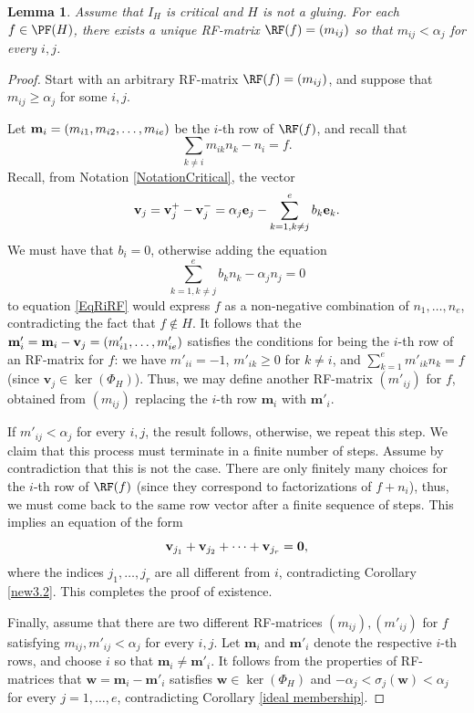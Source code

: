 \documentclass[11pt,twoside]{amsart}
\def\bv{{\mathbf v}}
\def\bw{{\mathbf w}}
\def\bm{{\mathbf m}}
\def\al{\alpha}
\newtheorem{lem}[Theorem]{Lemma}
\theoremstyle{definition}
\numberwithin{equation}{section}
\begin{document}
\begin{lem}\label{mij<alj}
Assume that $I_H$ is critical and  $H$ is not a gluing. 
For each $f \in \PF(H)$,
there exists a unique RF-matrix
	$\RF(f)= (m_{ij})$ so that $m_{ij} < \al_j$ for every $i,j$.   
\end{lem}


\begin{proof} 
Start with an arbitrary RF-matrix  $\RF(f) =(m_{ij})$, and suppose that $m_{ij}\ge \al_j$ for some $i,j$.

Let ${\bf m}_i = (m_{i1}, m_{i2}, \ldots , m_{ie})$ be the $i$-th row of $\RF(f)$,
and recall that 
\begin{equation}\label{EqRiRF}
    \sum_{k\ne i}m_{ik}n_k-n_i =f.
\end{equation}
Recall, from 
Notation \ref{NotationCritical},
 the vector 
$$\bv_j = \bv_j^+-\bv_j^-  = \al_j{\bf e}_j-\sum_{k=1, k\ne j}^e b_k{\bf e}_k.$$
We must have that  $b_i=0$, otherwise adding the equation 
\[  \sum_{k=1, k\ne j}^e b_k n_k-\al_j n_j =0\]   
to equation \eqref{EqRiRF} would express  $f$ as a non-negative combination of $n_1, \ldots, n_e$, contradicting the fact that $f \notin H$.
It follows that the   $\bm'_i=\bm_i -{\bf v}_j = (m'_{i1}, \ldots , m'_{ie})$ satisfies the conditions for being the $i$-th row of an RF-matrix for $f$: we have $m'_{ii}=-1$, $m'_{ik}\geq 0$ for $k \ne i$, and $\sum_{k=1}^e m'_{ik}n_k = f$ (since $\bv_j \in \ker(\Phi_H)$).
Thus, we may define another RF-matrix $(m'_{ij})$ for $f$, 
obtained from $(m_{ij})$
replacing the $i$-th row  $\bm_i$ with 
$\bm'_i$.


If $m'_{ij} < \al_j$ for every $i,j$, the result follows, otherwise, we repeat this step.
We claim that this process must terminate in a finite number of steps.
Assume by contradiction that this is not the case.
There are only finitely many choices for the $i$-th row of $\RF(f)$
(since they correspond to factorizations of $f+n_i$),
thus, we must come back to 
the same row vector after a finite sequence of steps. 
This implies an equation of the form
\[ \bv_{j_1}+ \bv_{j_2}+ \cdots + \bv_{j_r} = {\bf 0},\]
where the indices $j_1,\ldots,j_r$ are all different from $i$, contradicting Corollary \ref{new3.2}.
This completes the proof of existence.

Finally, assume that there are two different RF-matrices $(m_{ij}), (m'_{ij})$ for $f$ satisfying $m_{ij}, m'_{ij} < \alpha_j$ for every $i,j$. 
Let $\bm_i$ and $\bm'_i$ denote the respective $i$-th rows, and choose $i$ so   that $\bm_i\ne \bm'_i$. 
It follows from the properties of RF-matrices that  $\bw =\bm_i-\bm'_i$ satisfies $\bw \in \ker(\Phi_H)$ and  $-\alpha_j < \sigma_j(\bw) < \alpha_j$ for every $j=1,\ldots,e$, contradicting Corollary \ref{ideal membership}.
\end{proof}
\end{document}
